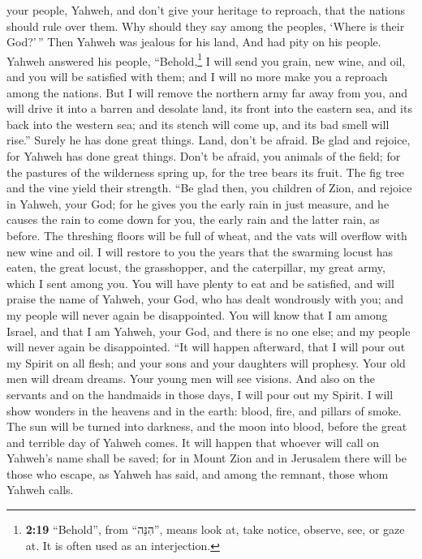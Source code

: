 your people, Yahweh, and don't give your heritage to reproach, that the
nations should rule over them. Why should they say among the peoples,
`Where is their God?'\,''  Then Yahweh was jealous for
his land, And had pity on his people.  Yahweh answered
his people, ``Behold,\footnote{\textbf{2:19} ``Behold'', from
  ``הִנֵּה'', means look at, take notice, observe, see, or gaze at. It
  is often used as an interjection.} I will send you grain, new wine,
and oil, and you will be satisfied with them; and I will no more make
you a reproach among the nations.  But I will remove the
northern army far away from you, and will drive it into a barren and
desolate land, its front into the eastern sea, and its back into the
western sea; and its stench will come up, and its bad smell will rise.''
Surely he has done great things.  Land, don't be afraid.
Be glad and rejoice, for Yahweh has done great things. 
Don't be afraid, you animals of the field; for the pastures of the
wilderness spring up, for the tree bears its fruit. The fig tree and the
vine yield their strength.  ``Be glad then, you children
of Zion, and rejoice in Yahweh, your God; for he gives you the early
rain in just measure, and he causes the rain to come down for you, the
early rain and the latter rain, as before.  The threshing
floors will be full of wheat, and the vats will overflow with new wine
and oil.  I will restore to you the years that the
swarming locust has eaten, the great locust, the grasshopper, and the
caterpillar, my great army, which I sent among you.  You
will have plenty to eat and be satisfied, and will praise the name of
Yahweh, your God, who has dealt wondrously with you; and my people will
never again be disappointed.  You will know that I am
among Israel, and that I am Yahweh, your God, and there is no one else;
and my people will never again be disappointed.  ``It
will happen afterward, that I will pour out my Spirit on all flesh; and
your sons and your daughters will prophesy. Your old men will dream
dreams. Your young men will see visions.  And also on the
servants and on the handmaids in those days, I will pour out my Spirit.
 I will show wonders in the heavens and in the earth:
blood, fire, and pillars of smoke.  The sun will be
turned into darkness, and the moon into blood, before the great and
terrible day of Yahweh comes.  It will happen that
whoever will call on Yahweh's name shall be saved; for in Mount Zion and
in Jerusalem there will be those who escape, as Yahweh has said, and
among the remnant, those whom Yahweh calls.

